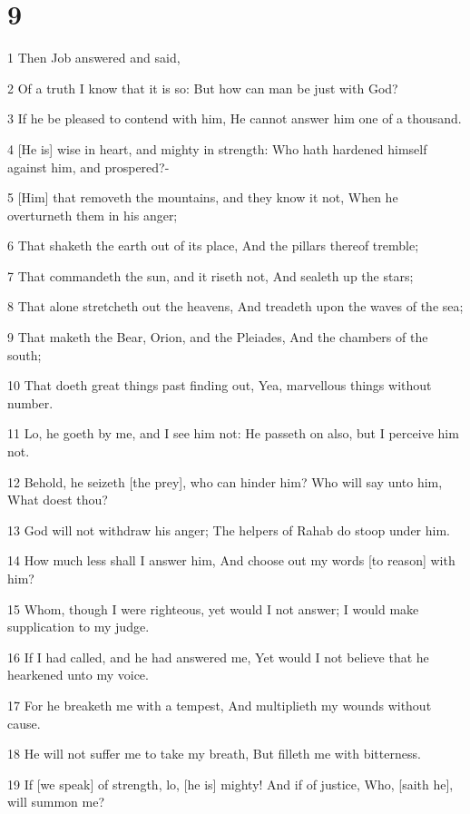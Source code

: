 \chapter{9}

\par 1 Then Job answered and said,
\par 2 Of a truth I know that it is so: But how can man be just with God?
\par 3 If he be pleased to contend with him, He cannot answer him one of a thousand.
\par 4 [He is] wise in heart, and mighty in strength: Who hath hardened himself against him, and prospered?-
\par 5 [Him] that removeth the mountains, and they know it not, When he overturneth them in his anger;
\par 6 That shaketh the earth out of its place, And the pillars thereof tremble;
\par 7 That commandeth the sun, and it riseth not, And sealeth up the stars;
\par 8 That alone stretcheth out the heavens, And treadeth upon the waves of the sea;
\par 9 That maketh the Bear, Orion, and the Pleiades, And the chambers of the south;
\par 10 That doeth great things past finding out, Yea, marvellous things without number.
\par 11 Lo, he goeth by me, and I see him not: He passeth on also, but I perceive him not.
\par 12 Behold, he seizeth [the prey], who can hinder him? Who will say unto him, What doest thou?
\par 13 God will not withdraw his anger; The helpers of Rahab do stoop under him.
\par 14 How much less shall I answer him, And choose out my words [to reason] with him?
\par 15 Whom, though I were righteous, yet would I not answer; I would make supplication to my judge.
\par 16 If I had called, and he had answered me, Yet would I not believe that he hearkened unto my voice.
\par 17 For he breaketh me with a tempest, And multiplieth my wounds without cause.
\par 18 He will not suffer me to take my breath, But filleth me with bitterness.
\par 19 If [we speak] of strength, lo, [he is] mighty! And if of justice, Who, [saith he], will summon me?
